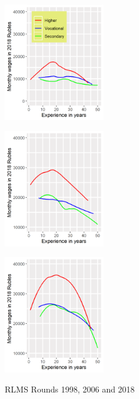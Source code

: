 \documentclass[alpha-refs]{wiley-article-04t}
\begin{document}
\begin{figure}[htbp!]
	\hspace{0.35in}
	\begin{minipage}[b]{.3\linewidth}
		\centering
		\hspace*{-0.7in}
		\includegraphics[width=125pt]{dp01_98.png}
		\label{fig:1.2a}
	\end{minipage}
	\hfill
	\begin{minipage}[b]{.3\linewidth}
		\centering
		\hspace*{-0.7in}
		\includegraphics[width=125pt]{dp01_06.png}
		\label{fig:1.2b}
	\end{minipage}
	\hfill
	\begin{minipage}[b]{.3\linewidth}
		\centering
		\hspace*{-0.7in}
		\includegraphics[width=125pt]{dp01_18.png}
		\label{fig:1.2c}
	\end{minipage}
	\caption{RLMS Rounds 1998, 
		2006 and 2018}\label{fig:1.2}
\end{figure}
\end{document}
